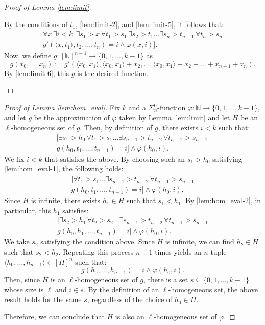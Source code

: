 \documentclass[10pt,reqno]{amsart}
\numberwithin{equation}{section}
\begin{document}
\begin{proof}[Proof of Lemma \ref{lem:limit}]
\begin{enumerate}[label=(\roman*),topsep=0.5em,itemsep=0.5em]
  By the conditions of $t_1$, \eqref{lem:limit-2}, and \eqref{lem:limit-5}, it follows that:
  \begin{multline}
\forall x \, \exists i < k \, \big[\exists s_1 > x \, \forall t_1 > s_1 \, \exists s_2 > t_1 \dots \exists s_n > t_{n-1} \, \forall t_n > s_n \\
g'(\langle x,t_1 \rangle,t_2,\dots,t_n)=i \land \varphi(x,i) \big]. \label{lem:limit-6}
  \end{multline}
Now, we define $g\colon[\mathbb{N}]^{n+1}\to\{0,1,\dots,k-1\}$ as
\[
g(x_0,\dots,x_n):=g'(\langle x_0,x_1 \rangle, \langle x_0,x_1 \rangle +x_2, \dots ,\langle x_0,x_1 \rangle+x_2+ \dots +x_{n-1}+x_n).
\]
By \eqref{lem:limit-6}, this $g$ is the desired function.
 \end{enumerate}
\end{proof}


\begin{proof}[Proof of Lemma \ref{lem:hom_eval}]
Fix $k$ and a $\Sigma_{n}^{0}$-function $\varphi\colon\mathbb{N}\to\{0,1,\dots,k-1\}$, and let $g$ be the approximation of $\varphi$ taken by Lemma \ref{lem:limit} and let $H$ be an $\ell$-homogeneous set of $g$. Then, by definition of $g$, there exists $i<k$ such that:
\begin{multline}
\big[\exists s_1 > h_0 \, \forall t_1 > s_1 \dots \exists s_{n-1} > t_{n-2} \, \forall t_{n-1} > s_{n-1} \, \\
g(h_0,t_1,\dots,t_{n-1})=i\big] \land \varphi(h_0,i). \label{lem:hom_eval-1}
\end{multline}
We fix $i<k$ that satisfies the above.
By choosing such an $s_1>h_0$ satisfying \eqref{lem:hom_eval-1}, the following holds:
\begin{multline}
 \big[\forall t_1 > s_1 \dots \exists s_{n-1} > t_{n-2} \, \forall t_{n-1} > s_{n-1} \\
 g(h_0,t_1,\dots,t_{n-1})=i\big] \land \varphi(h_0,i). \label{lem:hom_eval-2}
 \end{multline}
Since $H$ is infinite, there exists $h_1\in H$ such that $s_1<h_1$. By \eqref{lem:hom_eval-2}, in particular, this $h_1$ satisfies:
\begin{multline}
\big[\exists s_2 > h_1 \, \forall t_2 > s_2 \dots \exists s_{n-1} > t_{n-2} \, \forall t_{n-1} > s_{n-1} \\
g(h_0,h_1,\dots,t_{n-1})=i\big] \land \varphi(h_0,i).
\end{multline}
We take $s_2$ satisfying the condition above. Since $H$ is infinite, we can find $h_2\in H$ such that $s_2<h_2$. Repeating this process $n-1$ times yields an $n$-tuple $\langle h_0,\dots,h_{n-1} \rangle\in[H]^{n}$ such that:
\[
 g(h_0,\dots,h_{n-1})=i \land \varphi(h_0,i).
 \]
Then, since $H$ is an $\ell$-homogeneous set of $g$, there is a set $s\subseteq\{0,1,\dots,k-1\}$ whose size is $\ell$ and $i \in s$.
By the definition of an $\ell$-homogeneous set, the above result holds for the same $s$, regardless of the choice of $h_0\in{H}$.


Therefore, we can conclude that $H$ is also an $\ell$-homogeneous set of $\varphi$.
\end{proof}
\end{document}
